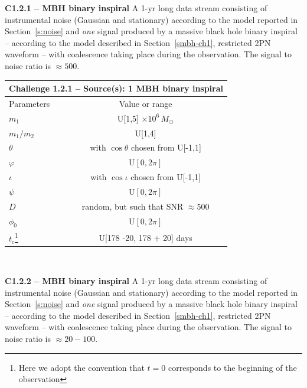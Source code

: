 \documentclass[11pt]{report}
\begin{document}
\begin{description}

\item {\bf C1.2.1 -- MBH binary inspiral} A 1-yr long data stream consisting of instrumental noise (Gaussian and stationary) according to the model reported in Section~\ref{s:noise} and {\em one} signal produced by a massive black hole binary inspiral -- according to the model described in Section~\ref{smbh-ch1}, restricted 2PN waveform -- with coalescence taking place during the observation. The signal to noise ratio is $\approx 500$. 

\begin{center}
\begin{tabular}{l|c}
\hline \hline
\multicolumn{2}{c}{{\bf Challenge 1.2.1 -- Source(s): 1 MBH binary inspiral}} \\
\hline
Parameters & Value or range \\
\hline
$m_1$             & U[1,5] $\times 10^6\,M_\odot$ \\
$m_1/m_2$         & U[1,4] \\
$\theta$          & with $\cos\theta$ chosen from U[-1,1]\\
$\varphi$         & U$[0,2\pi]$ \\ 
$\iota$           & with $\cos\iota$ chosen from U[-1,1]\\ 
$\psi$            & U$[0,2\pi]$ \\
$D$        & random, but such that SNR $\approx 500$ \\
$\phi_0$          & U$[0,2\pi]$ \\
$t_c$\footnote{Here we adopt the convention that $t = 0$ corresponds to the beginning of the observation}             & U[178 -20, 178 + 20] days \\
\hline \hline
\end{tabular} \\
\end{center}

\item {\bf C1.2.2 -- MBH binary inspiral} A 1-yr long data stream consisting of instrumental noise (Gaussian and stationary) according to the model reported in Section~\ref{s:noise} and {\em one} signal produced by a massive black hole binary inspiral -- according to the model described in Section~\ref{smbh-ch1}, restricted 2PN waveform -- with coalescence taking place during the observation. The signal to noise ratio is $\approx 20-100$. 


\end{description}
\end{document}
